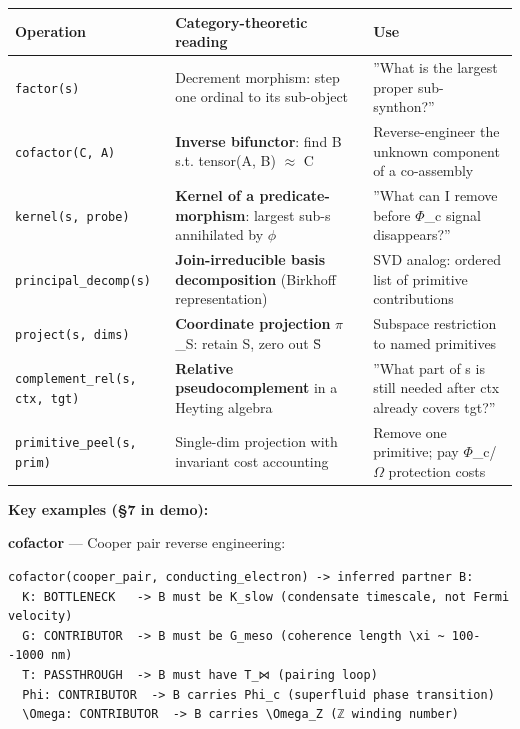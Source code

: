 \documentclass[12pt,a4paper]{article}
\begin{document}
\begin{table}[htbp]
\centering
\small
{}
\begin{tabularx}{\textwidth}{>{\centering\arraybackslash}X >{\centering\arraybackslash}X >{\centering\arraybackslash}X}
\toprule
\rowcolor{gray!25}\textbf{Operation} & \textbf{Category-theoretic reading} & \textbf{Use} \\
\midrule
\rowcolors{1}{white}{gray!10}
\texttt{factor(s)} & Decrement morphism: step one ordinal to its sub-object & ''What is the largest proper sub-synthon?'' \\
\texttt{cofactor(C, A)} & \textbf{Inverse bifunctor}: find B s.t. tensor(A, B) $\approx$ C & Reverse-engineer the unknown component of a co-assembly \\
\texttt{kernel(s, probe)} & \textbf{Kernel of a predicate-morphism}: largest sub-s annihilated by $\phi$ & ''What can I remove before $\Phi$\_c signal disappears?'' \\
\texttt{principal\_decomp(s)} & \textbf{Join-irreducible basis decomposition} (Birkhoff representation) & SVD analog: ordered list of primitive contributions \\
\texttt{project(s, dims)} & \textbf{Coordinate projection} $\pi$\_S: retain S, zero out S̄ & Subspace restriction to named primitives \\
\texttt{complement\_rel(s, ctx, tgt)} & \textbf{Relative pseudocomplement} in a Heyting algebra & ''What part of s is still needed after ctx already covers tgt?'' \\
\texttt{primitive\_peel(s, prim)} & Single-dim projection with invariant cost accounting & Remove one primitive; pay $\Phi$\_c/$\Omega$ protection costs \\
\bottomrule
\end{tabularx}
\end{table}

\textbf{Key examples (§7 in demo):}

\textbf{cofactor} --- Cooper pair reverse engineering:

\begin{lstlisting}
cofactor(cooper_pair, conducting_electron) -> inferred partner B:
  K: BOTTLENECK   -> B must be K_slow (condensate timescale, not Fermi velocity)
  G: CONTRIBUTOR  -> B must be G_meso (coherence length \xi ~ 100--1000 nm)
  T: PASSTHROUGH  -> B must have T_⋈ (pairing loop)
  Phi: CONTRIBUTOR  -> B carries Phi_c (superfluid phase transition)
  \Omega: CONTRIBUTOR  -> B carries \Omega_Z (ℤ winding number)
\end{lstlisting}
\end{document}
